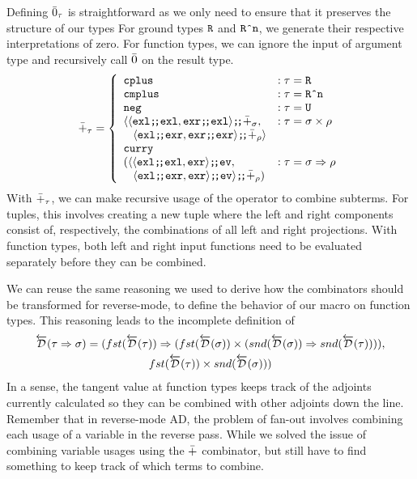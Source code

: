   Defining $\bar{0}_\tau$ is straightforward as we only need to ensure that it preserves the structure of our types
  For ground types $\texttt{R}$ and $\texttt{R\^{}n}$, we generate their respective interpretations of zero.
  For function types, we can ignore the input of argument type and recursively call $\bar{0}$ on the result type.
  \begin{align*}
    \synP_\tau =
      \left\{
        \begin{array}{ll}
          \synCplus & : \tau = \synR \\
          \synCmplus & : \tau = \synRn \\
          \synNeg & : \tau = \synUnit \\
          \langle
            \synSeq{\langle \synSeq{\synExl}{\synExl}, \synSeq{\synExr}{\synExl} \rangle}{\synP_\sigma}, & : \tau = \sigma \synStar \rho \\
            \;\;\;\synSeq{\langle \synSeq{\synExl}{\synExr}, \synSeq{\synExr}{\synExr} \rangle}{\synP_\rho} \rangle \\
          \synCurry{ \\
            (\synSeq{\langle
              \synSeq{\langle \synSeq{\synExl}{\synExl}, \synExr \rangle}{\synEv}, & : \tau = \sigma \synFunc \rho \\
              \;\;\;\synSeq{\langle \synSeq{\synExl}{\synExr}, \synExr \rangle}{\synEv} \rangle}{\synP_\rho})} \\
        \end{array}
      \right.
  \end{align*}
  With $\bar{+}_\tau$, we can make recursive usage of the operator to combine subterms.
  For tuples, this involves creating a new tuple where the left and right components consist of, respectively, the combinations of all left and right projections.
  With function types, both left and right input functions need to be evaluated separately before they can be combined.

  We can reuse the same reasoning we used to derive how the combinators should be transformed for reverse-mode, to define the behavior of our macro on function types.
  This reasoning leads to the incomplete definition of
  \begin{multline}
    \overleftarrow{\mathcal{D}}(\tau \Rightarrow \sigma) = (fst(\overleftarrow{\mathcal{D}}(\tau)) \Rightarrow (fst(\overleftarrow{\mathcal{D}}(\sigma)) \times (snd(\overleftarrow{\mathcal{D}}(\sigma)) \Rightarrow snd(\overleftarrow{\mathcal{D}}(\tau)))),
      \\ fst(\overleftarrow{\mathcal{D}}(\tau)) \times snd (\overleftarrow{\mathcal{D}}(\sigma)))
    \label{eqn:combinator_d_incorrect}
  \end{multline}
  In a sense, the tangent value at function types keeps track of the adjoints currently calculated so they can be combined with other adjoints down the line.
  Remember that in reverse-mode AD, the problem of fan-out involves combining each usage of a variable in the reverse pass.
  While we solved the issue of combining variable usages using the $\bar{+}$ combinator, but still have to find something to keep track of which terms to combine.

